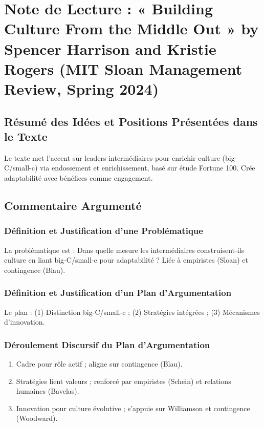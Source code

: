 \documentclass[11pt]{rapportECL}
\begin{document}
\section{Note de Lecture : « Building Culture From the Middle Out » by Spencer Harrison and Kristie Rogers (MIT Sloan Management Review, Spring 2024)}

\subsection{Résumé des Idées et Positions Présentées dans le Texte}
Le texte met l’accent sur leaders intermédiaires pour enrichir culture (big-C/small-c) via endossement et enrichissement, basé sur étude Fortune 100. Crée adaptabilité avec bénéfices comme engagement.

\subsection{Commentaire Argumenté}

\subsubsection{Définition et Justification d’une Problématique}
La problématique est : Dans quelle mesure les intermédiaires construisent-ils culture en liant big-C/small-c pour adaptabilité ? Liée à empiristes (Sloan) et contingence (Blau).

\subsubsection{Définition et Justification d’un Plan d’Argumentation}
Le plan : (1) Distinction big-C/small-c ; (2) Stratégies intégrées ; (3) Mécanismes d’innovation.

\subsubsection{Déroulement Discursif du Plan d’Argumentation}
\begin{enumerate}
\item Cadre pour rôle actif ; aligne sur contingence (Blau).
\item Stratégies lient valeurs ; renforcé par empiristes (Schein) et relations humaines (Bavelas).
\item Innovation pour culture évolutive ; s’appuie sur Williamson et contingence (Woodward).
\end{enumerate}
\end{document}

